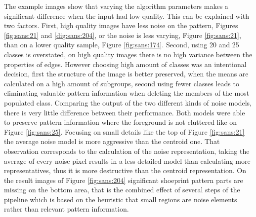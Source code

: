 \documentclass[draft,final]{vutinfth} %
\begin{document}
\par
The example images show that varying the algorithm parameters makes a significant difference when the input had low quality.
This can be explained with two factors.
First, high quality images have less noise on the pattern, Figures \ref{fig:sans:21} and \ref{dig:sans:204}, or the noise is less varying, Figure \ref{fig:sans:21}, than on a lower quality sample, Figure \ref{fig:sans:174}.
Second, using 20 and 25 classes is overstated, on high quality images there is no high variance between the properties of edges.
However choosing high amount of classes was an intentional decision, first the structure of the image is better preserved, when the means are calculated on a high amount of subgroups, second using fewer classes leads to eliminating valuable pattern information when deleting the members of the most populated class.
Comparing the output of the two different kinds of noise models, there is very little difference between their performance.
Both models were able to preserve pattern information where the foreground is not cluttered like on Figure \ref{fig:sans:25}.
Focusing on small details like the top of Figure \ref{fig:sans:21} the average noise model is more aggressive than the centroid one.
That observation corresponds to the calculation of the noise representation, taking the average of every noise pixel results in a less detailed model than calculating more representatives, thus it is more destructive than the centroid representation.
On the result images of Figure \ref{fig:sans:204} significant shoeprint pattern parts are missing on the bottom area, that is the combined effect of several steps of the pipeline which is based on the heuristic that small regions are noise elements rather than relevant pattern information.
\end{document}
